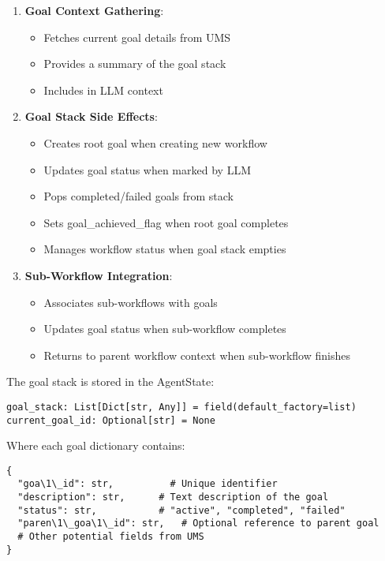 \documentclass[12pt,a4paper]{article}
\begin{document}
\begin{enumerate}[label=\arabic*.]
    \item \textbf{Goal Context Gathering}:
    \begin{itemize}
        \item Fetches current goal details from UMS
        \item Provides a summary of the goal stack
        \item Includes in LLM context
    \end{itemize}
    \item \textbf{Goal Stack Side Effects}:
    \begin{itemize}
        \item Creates root goal when creating new workflow
        \item Updates goal status when marked by LLM
        \item Pops completed/failed goals from stack
        \item Sets goal\_achieved\_flag when root goal completes
        \item Manages workflow status when goal stack empties
    \end{itemize}
    \item \textbf{Sub-Workflow Integration}:
    \begin{itemize}
        \item Associates sub-workflows with goals
        \item Updates goal status when sub-workflow completes
        \item Returns to parent workflow context when sub-workflow finishes
    \end{itemize}
\end{enumerate}

The goal stack is stored in the AgentState:
\begin{pageablecode}
\begin{verbatim}
goal_stack: List[Dict[str, Any]] = field(default_factory=list)
current_goal_id: Optional[str] = None
\end{verbatim}
\end{pageablecode}
Where each goal dictionary contains:
\begin{verbatim}
{
  "goa\1\_id": str,          # Unique identifier
  "description": str,      # Text description of the goal
  "status": str,           # "active", "completed", "failed"
  "paren\1\_goa\1\_id": str,   # Optional reference to parent goal
  # Other potential fields from UMS
}
\end{verbatim}
\end{document}
